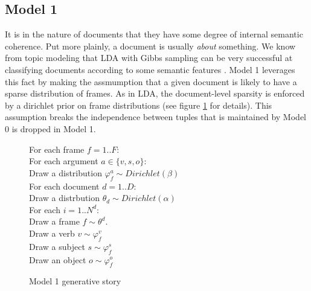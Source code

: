 \documentclass{article} %
\renewcommand\phi\varphi
\begin{document}
\subsection{Model 1}

It is in the nature of documents that they have some degree of internal semantic
coherence. Put more plainly, a document is usually \emph{about} something. We
know from topic modeling that LDA with Gibbs sampling can be very successful at
classifying documents according to some semantic features \citep{griffiths2004}.
Model 1 leverages this fact by making the assmumption that a given document is 
likely to have a sparse distribution of frames. As in LDA, the document-level
sparsity is enforced by a dirichlet prior on frame distributions (see figure
\ref{gen1} for details). This assumption breaks the independence between tuples 
that is maintained by Model 0 is dropped in Model 1.

\begin{figure}

    \begin{snugshade}
    \scriptsize
    For each frame $f=1..F$:\\
    \hspace*{15pt} For each argument $a\in\{v,s,o\}$:\\
    \hspace*{30pt} Draw a distribution $\phi_f^a\sim Dirichlet(\beta)$\\
    For each document $d=1..D$:\\
    \hspace*{15pt} Draw a distrbution $\theta_d \sim Dirichlet(\alpha)$\\
    \hspace*{30pt} For each $i = 1..N^d$:\\
    \hspace*{30pt} Draw a frame $f \sim \theta^d$.\\
    \hspace*{30pt} Draw a verb $v \sim \phi_f^v$\\
    \hspace*{30pt} Draw a subject $s \sim \phi_f^s$\\
    \hspace*{30pt} Draw an object $o \sim \phi_f^o$
    \end{snugshade}

    

    \caption{Model 1 generative story}
    \label{gen1}

\end{figure}
\end{document}

